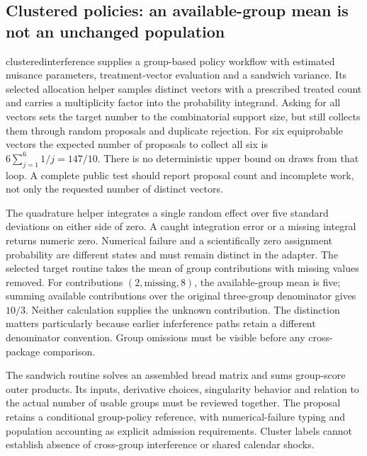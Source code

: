 \subsection{Clustered policies: an available-group mean is not an unchanged population}

clusteredinterference supplies a group-based policy workflow with estimated nuisance parameters, treatment-vector evaluation and a sandwich variance. Its selected allocation helper samples distinct vectors with a prescribed treated count and carries a multiplicity factor into the probability integrand. Asking for all vectors sets the target number to the combinatorial support size, but still collects them through random proposals and duplicate rejection. For six equiprobable vectors the expected number of proposals to collect all six is $6\sum_{j=1}^6 1/j=147/10$. There is no deterministic upper bound on draws from that loop. A complete public test should report proposal count and incomplete work, not only the requested number of distinct vectors.~\citep{exec25_rnet_cluster,exec25_rnet_choice}

The quadrature helper integrates a single random effect over five standard deviations on either side of zero. A caught integration error or a missing integral returns numeric zero. Numerical failure and a scientifically zero assignment probability are different states and must remain distinct in the adapter. The selected target routine takes the mean of group contributions with missing values removed. For contributions $(2,\text{missing},8)$, the available-group mean is five; summing available contributions over the original three-group denominator gives $10/3$. Neither calculation supplies the unknown contribution. The distinction matters particularly because earlier inferference paths retain a different denominator convention. Group omissions must be visible before any cross-package comparison.~\citep{exec25_rnet_cluster,exec24_interference_inferference,exec25_rnet_choice}

The sandwich routine solves an assembled bread matrix and sums group-score outer products. Its inputs, derivative choices, singularity behavior and relation to the actual number of usable groups must be reviewed together. The proposal retains a conditional group-policy reference, with numerical-failure typing and population accounting as explicit admission requirements. Cluster labels cannot establish absence of cross-group interference or shared calendar shocks.~\citep{exec25_rnet_cluster}

